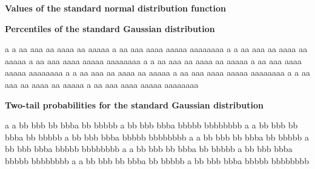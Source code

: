 \documentclass[a4paper]{article}
\begin{document}
\begin{center}
  {\Large\bf Values of the standard normal distribution function}
\end{center}

\begin{minipage}{7cm}
  \begin{center}
    {\Large\bf Percentiles of the standard Gaussian distribution}
  \end{center}
  
a a aa aaa aa aaaa aa aaaaa a aa aaa aaaa aaaaa aaaaaaaa 
a a aa aaa aa aaaa aa aaaaa a aa aaa aaaa aaaaa aaaaaaaa 
a a aa aaa aa aaaa aa aaaaa a aa aaa aaaa aaaaa aaaaaaaa 
a a aa aaa aa aaaa aa aaaaa a aa aaa aaaa aaaaa aaaaaaaa 
a a aa aaa aa aaaa aa aaaaa a aa aaa aaaa aaaaa aaaaaaaa 
\end{minipage}\hfill
\begin{minipage}{7cm}
  \begin{center}
    {\Large\bf Two-tail probabilities for the standard Gaussian distribution}
  \end{center}
a a bb bbb bb bbba bb bbbbb a bb bbb bbba bbbbb bbbbbbbb 
a a bb bbb bb bbba bb bbbbb a bb bbb bbba bbbbb bbbbbbbb 
a a bb bbb bb bbba bb bbbbb a bb bbb bbba bbbbb bbbbbbbb 
a a bb bbb bb bbba bb bbbbb a bb bbb bbba bbbbb bbbbbbbb 
a a bb bbb bb bbba bb bbbbb a bb bbb bbba bbbbb bbbbbbbb 
\end{minipage}



\end{document}
